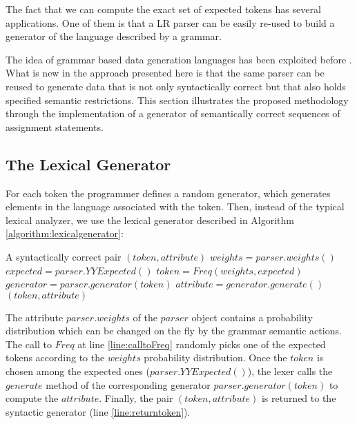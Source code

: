 The fact that we can compute the exact set of expected tokens 
has several applications. One of them is that a LR parser 
can be easily re-used to build a generator of the language described by
a grammar.

The idea  of grammar based data generation languages
has been exploited before \cite{maurer,yagg}.
What is new in the approach presented here is that
the same parser can be reused to 
generate data that is not only syntactically correct but
that also holds specified semantic restrictions. 
This section illustrates the proposed methodology
through the implementation of a generator of semantically correct
sequences of assignment statements.

\subsection{The Lexical Generator}

For each token the programmer defines a random generator,
which generates elements in the language associated with the token.
Then, instead of the typical lexical analyzer,
we use the lexical generator described in
Algorithm \ref{algorithm:lexicalgenerator}:


\begin{algorithm}[h] 
\caption{$LexicalGenerator(parser)$}
\label{algorithm:lexicalgenerator}
\begin{algorithmic}[1]
\ENSURE A syntactically correct pair $(token, attribute)$
\STATE  \label{line:weights} $weights = parser.weights()$
\STATE  \label{line:expected}$expected = parser.YYExpected()$
\STATE  \label{line:calltoFreq} $token = Freq(weights, expected)$
\STATE  \label{line:setgen}$generator = parser.generator(token)$
\STATE  \label{line:setattr}$attribute = generator.generate()$
\RETURN \label{line:returntoken}$(token, attribute)$
\end{algorithmic}
\end{algorithm}
    
The attribute $parser.weights$ of the $parser$ object
contains a probability distribution
which can be changed on the fly by the grammar semantic actions.
The call to $Freq$ at line \ref{line:calltoFreq}
randomly picks one of the expected tokens
according to the $weights$ probability distribution.
Once the $token$ is chosen among the expected ones ($parser.YYExpected()$), 
the lexer 
calls the $generate$ method of the corresponding generator 
$parser.generator(token)$ to compute the $attribute$.
Finally, the pair $(token, attribute)$ is returned to the
syntactic generator (line \ref{line:returntoken}).

